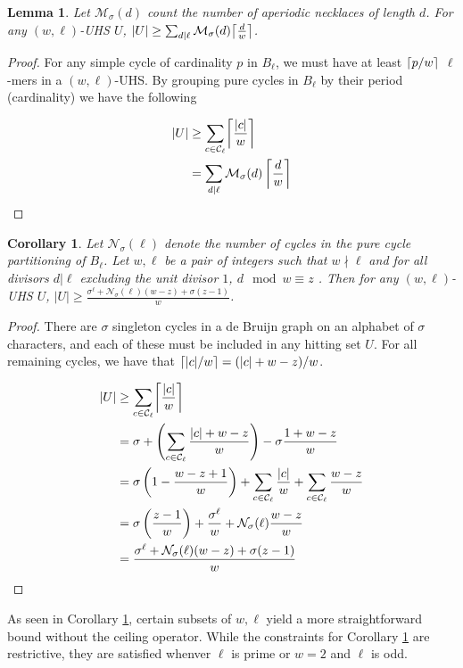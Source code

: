 \documentclass{article}
\newtheorem{lemma}[theorem]{Lemma}
\newtheorem{corollary}[theorem]{Corollary}
\DeclarePairedDelimiter\ceil{\lceil}{\rceil}
\begin{document}
\begin{lemma}
\label{lem:UHS-LB}
Let $\mathcal{M}_\sigma(d)$ count the number of aperiodic necklaces of length $d$. For any $(w, \ell)$-UHS $U$,  $|U|\geq \sum_{d|\ell}\mathcal{M}_\sigma(d)\ceil*{\frac{d}{w}}$.
\end{lemma}
\begin{proof}
For any simple cycle of cardinality $p$  in $B_\ell$, we must have at least $\ceil*{{p}/{w}}$ $\ell$-mers in a $(w, \ell)$-UHS. By grouping pure cycles in $B_\ell$ by their period (cardinality) we have the following 

\begin{align*}
 |U|&\geq   \sum_{c\in \mathcal{C}_{\ell}} \ceil*{\frac{|c|}{w}}\\
&= \sum_{d|\ell}\mathcal{M}_\sigma(d)\left\lceil \frac{d}{w}\right\rceil
\end{align*}

\end{proof}

 

\begin{corollary}
    \label{lemma:UHS-dzmodw}
    Let $\mathcal{N}_\sigma(\ell)$ denote the number of cycles in the pure cycle partitioning of $B_\ell$. Let $w, \ell$ be a pair of integers such that $w\nmid \ell$ and for all divisors $d|\ell$  excluding the unit divisor $1$, $d\mod w \equiv z$ . Then for any $(w, \ell)$-UHS $U$, $
    |U| \geq  \frac{\sigma^\ell+\mathcal{N}_\sigma(\ell)(w-z)+\sigma(z-1)}{w} 
    $.

\end{corollary}
\begin{proof}
There are $\sigma$ singleton cycles in a de Bruijn graph on an alphabet of $\sigma$ characters, and each of these must be included in any hitting set $U$. For all remaining cycles, we have that $\ceil*{{|c|}/{w}}={(|c| + w - z)}/{w}$.

\begin{align*}
|U| &\geq \sum_{c\in \mathcal{C}_{\ell}} \ceil*{\frac{|c|}{w}}\\
 &= \sigma + \left(\sum_{c\in \mathcal{C}_{\ell}} \frac{|c| + w - z}{w}\right) - \sigma\frac{1 + w - z}{w} \\
& = \sigma\left(1-\frac{ w - z + 1}{w}\right) + \sum_{c\in \mathcal{C}_{\ell}}\frac{|c|}{w} + \sum_{c\in \mathcal{C}_{\ell}}\frac{w-z}{w} \\
& = \sigma\left(\frac{z-1}{w}\right) + \frac{\sigma^\ell}{w} + \mathcal{N}_\sigma(\ell)\frac{w-z}{w} \\
& = \frac{\sigma^\ell+\mathcal{N}_\sigma(\ell)(w-z)+\sigma(z-1)}{w} 
\end{align*}
\end{proof}
As seen in Corollary \ref{lemma:UHS-dzmodw}, certain subsets of $w, \ell$ yield a more straightforward bound without the ceiling operator. While the constraints for Corollary \ref{lemma:UHS-dzmodw} are restrictive, they are satisfied whenver $\ell$ is prime or $w=2$ and $\ell$ is odd.  
\end{document}
